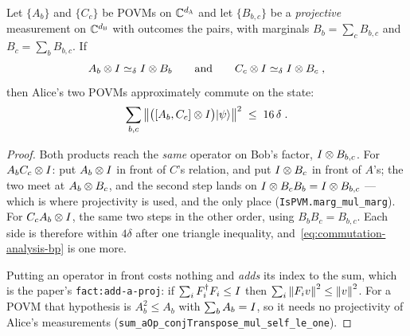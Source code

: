 \begin{lemma}
\label{lem:commutation-analysis}
\leanok
Let $\{A_b\}$ and $\{C_c\}$ be POVMs on $\mathbb{C}^{d_{\textsc{A}}}$ and let $\{B_{b,c}\}$ be a
\emph{projective} measurement on $\mathbb{C}^{d_{\textsc{B}}}$ with outcomes the pairs, with marginals
$B_b = \sum_c B_{b,c}$ and $B_c = \sum_b B_{b,c}$. If
\begin{equation*}
  A_b \otimes I \simeq_\delta I \otimes B_b \qquad\text{and}\qquad
  C_c \otimes I \simeq_\delta I \otimes B_c\;,
\end{equation*}
then Alice's two POVMs approximately commute on the state:
\begin{equation}
  \label{eq:commutation-analysis-bp}
  \sum_{b, c} \left\| {\bigl( [A_b, C_c] \otimes I \bigr) |\psi\rangle} \right\|^2 \;\leq\; 16\, \delta\;.
\end{equation}
\end{lemma}

\begin{proof}
\leanok
{}
Both products reach the \emph{same} operator on Bob's factor, $I \otimes B_{b,c}$. For
$A_b C_c \otimes I$: put $A_b \otimes I$ in front of $C$'s relation, and put $I \otimes B_c$ in front of
$A$'s; the two meet at $A_b \otimes B_c$, and the second step lands on
$I \otimes B_c B_b = I \otimes B_{b,c}$ --- which is where projectivity is used, and the only place
(\texttt{IsPVM.marg\_mul\_marg}). For $C_c A_b \otimes I$, the same two steps in the other order,
using $B_b B_c = B_{b,c}$. Each side is therefore within $4\delta$ after one triangle inequality,
and~\eqref{eq:commutation-analysis-bp} is one more.

Putting an operator in front costs nothing and \emph{adds} its index to the sum, which is the
paper's \texttt{fact:add-a-proj}: if $\sum_i F_i^\dagger F_i \leq I$ then
$\sum_i \left\| {F_i v} \right\|^2 \leq \left\| {v} \right\|^2$. For a POVM that hypothesis is $A_b^2 \leq A_b$ with
$\sum_b A_b = I$, so it needs no projectivity of Alice's measurements
(\texttt{sum\_aOp\_conjTranspose\_mul\_self\_le\_one}).
\end{proof}

